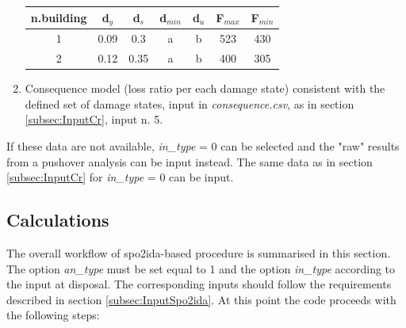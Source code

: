 \begin{enumerate}
\begin{table}[H]
\centering
\begin{tabular}{|c|c|c|c|c|c|c|} \hline
\textbf{n.building} & \textbf{d$_y$} & \textbf{d$_s$} & \textbf{d$_{min}$} & \textbf{d$_u$} & \textbf{F$_{max}$} & \textbf{F$_{min}$} \\ \hline
1 & 0.09	& 0.3	& a & b & 523 & 430\\ \hline
2 & 0.12	& 0.35	 & a & b & 400 & 305\\ \hline	
\end{tabular}
\end{table}

\item Consequence model (loss ratio per each damage state) consistent with the defined set of damage states, input in \textit{consequence.csv}, as in section \ref{subsec:InputCr}, input n. 5.
	
\end{enumerate}

If these data are not available, \textit{in\_type} = 0 can be selected and the "raw" results from a pushover analysis can be input instead. The same data as in section \ref{subsec:InputCr} for \textit{in\_type} = 0 can be input.

\subsection{Calculations}
The overall workflow of spo2ida-based procedure is summarised in this section. The option \textit{an\_type} must be set equal to 1 and the option \textit{in\_type} according to the input at disposal. The corresponding inputs should follow the requirements described in section \ref{subsec:InputSpo2ida}. At this point the code proceeds with the following steps:


